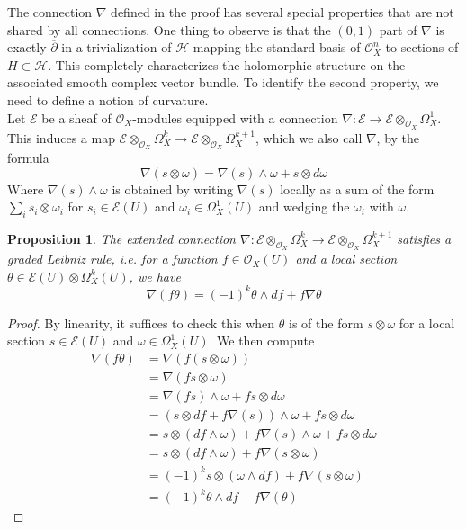 \documentclass[psamsfonts, 12pt]{amsart}
\newtheorem{prop}[thm]{Proposition}
\theoremstyle{definition}
\theoremstyle{remark}
\renewcommand{\O}{\mathcal{O}}
\newcommand{\dbar}{\overline{\partial}}
\begin{document}
%
The connection $\nabla$ defined in the proof has several special properties that
are not shared by all connections. One thing to observe is that the
$(0,1)$ part of $\nabla$ is exactly $\dbar$ in a trivialization of
$\mathcal{H}$ mapping the standard basis of $\O^n_X$ to sections of
$H \subset \mathcal{H}$. This completely characterizes the holomorphic structure
on the associated smooth complex vector bundle. To identify the second property,
we need to define a notion of curvature. \\

Let $\mathcal{E}$ be a sheaf of $\O_X$-modules equipped with a connection
$\nabla : \mathcal{E} \to \mathcal{E} \otimes_{\O_X} \Omega^1_X$. This induces a map
$\mathcal{E} \otimes_{\O_X} \Omega^k_X \to \mathcal{E} \otimes_{\O_X} \Omega^{k+1}_X$,
which we also call $\nabla$, by the formula
\[
\nabla(s \otimes \omega) = \nabla(s) \wedge \omega + s \otimes d\omega
\]
Where $\nabla(s) \wedge \omega$ is obtained by writing $\nabla(s)$ locally as a sum
of the form $\sum_i s_i \otimes \omega_i$ for $s_i \in \mathcal{E}(U)$ and
$\omega_i \in \Omega^1_X(U)$ and wedging the $\omega_i$ with $\omega$.
%
\begin{prop}
The extended connection
$\nabla:\mathcal{E}\otimes_{\O_X}\Omega^k_X \to \mathcal{E}\otimes_{\O_X}\Omega^{k+1}_X$
satisfies a graded Leibniz rule, i.e. for a function $f \in \O_X(U)$ and a local
section $\theta \in \mathcal{E}(U) \otimes \Omega^k_X(U)$, we have
\[
\nabla(f\theta) = (-1)^k \theta \wedge df + f\nabla\theta
\]
\end{prop}
%
\begin{proof}
By linearity, it suffices to check this when $\theta$ is of the form $s \otimes \omega$
for a local section $s \in \mathcal{E}(U)$ and $\omega \in \Omega^1_X(U)$. We then
compute
\begin{align*}
\nabla(f\theta) &= \nabla(f(s\otimes\omega)) \\
&= \nabla(fs \otimes \omega) \\
&= \nabla(fs) \wedge \omega + fs \otimes d\omega \\
&= (s \otimes df + f\nabla(s))\wedge \omega + fs \otimes d\omega \\
&= s \otimes(df\wedge\omega) + f\nabla(s)\wedge\omega + fs\otimes d\omega \\
&= s \otimes (df \wedge \omega) + f\nabla(s \otimes \omega) \\
&= (-1)^k s\otimes(\omega \wedge df) + f\nabla(s\otimes\omega) \\
&= (-1)^k \theta\wedge df + f\nabla(\theta)
\end{align*}
\end{proof}
\end{document}
